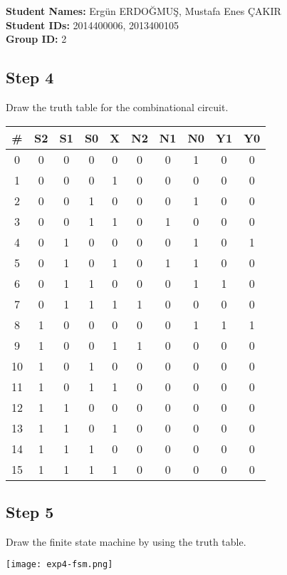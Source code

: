 \documentclass[12pt,a4paper]{report}
\begin{document}
\pagebreak
\noindent
\textbf{Student Names:} Ergün ERDOĞMUŞ, Mustafa Enes ÇAKIR \\
\textbf{Student IDs:} 2014400006, 2013400105 \\
\textbf{Group ID:} 2

\subsection*{Step 4}

Draw the truth table for the combinational circuit.
\begin{center}
	\begin{tabular}{|c|cccc|ccccc|}
		\hline
		\textbf{\#} & \textbf{S2} & \textbf{S1} & \textbf{S0} & \textbf{X} & \textbf{N2} & \textbf{N1} & \textbf{N0} & \textbf{Y1} & \textbf{Y0} \\
		\hline
		0 & 0 & 0 & 0 & 0 & 0 & 0 & 1 & 0 & 0 \\
		\hline
		1 & 0 & 0 & 0 & 1 & 0 & 0 & 0 & 0 & 0 \\
		\hline
		2 & 0 & 0 & 1 & 0 & 0 & 0 & 1 & 0 & 0 \\
		\hline
		3 & 0 & 0 & 1 & 1 & 0 & 1 & 0 & 0 & 0 \\
		\hline
		4 & 0 & 1 & 0 & 0 & 0 & 0 & 1 & 0 & 1 \\
		\hline
		5 & 0 & 1 & 0 & 1 & 0 & 1 & 1 & 0 & 0 \\
		\hline
		6 & 0 & 1 & 1 & 0 & 0 & 0 & 1 & 1 & 0 \\
		\hline
		7 & 0 & 1 & 1 & 1 & 1 & 0 & 0 & 0 & 0 \\
		\hline
		8 & 1 & 0 & 0 & 0 & 0 & 0 & 1 & 1 & 1 \\
		\hline
		9 & 1 & 0 & 0 & 1 & 1 & 0 & 0 & 0 & 0 \\
		\hline
		10 & 1 & 0 & 1 & 0 & 0 & 0 & 0 & 0 & 0 \\
		\hline
		11 & 1 & 0 & 1 & 1 & 0 & 0 & 0 & 0 & 0 \\
		\hline
		12 & 1 & 1 & 0 & 0 & 0 & 0 & 0 & 0 & 0 \\
		\hline
		13 & 1 & 1 & 0 & 1 & 0 & 0 & 0 & 0 & 0 \\
		\hline
		14 & 1 & 1 & 1 & 0 & 0 & 0 & 0 & 0 & 0 \\
		\hline
		15 & 1 & 1 & 1 & 1 & 0 & 0 & 0 & 0 & 0 \\
		\hline
	\end{tabular}
\end{center}

\subsection*{Step 5}
Draw the finite state machine by using the truth table.
\begin{center}
	\texttt{[image: exp4-fsm.png]}
\end{center}
\end{document}
